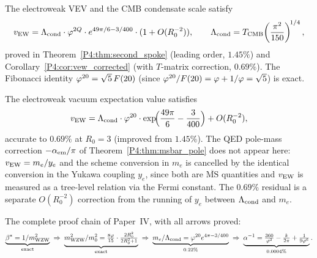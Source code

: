 \begin{result}
\label{P4:conj:spoke}
The electroweak VEV and the CMB condensate scale satisfy
\begin{equation}
  v_{\mathrm{EW}}
  = \Lambda_{\mathrm{cond}}\cdot\varphi^{2Q}\cdot e^{49\pi/6 - 3/400}\cdot(1+O(R_0^{-2})),
  \qquad
  \Lambda_{\mathrm{cond}} = T_{\mathrm{CMB}}\!\left(\frac{\pi^2}{150}\right)^{\!1/4},
  \label{P4:eq:spoke_formula}
\end{equation}
proved in Theorem~\ref{P4:thm:second_spoke} (leading order, $1.45\%$) and
Corollary~\ref{P4:cor:vew_corrected} (with $T$-matrix correction, $0.69\%$).
The Fibonacci identity $\varphi^{20} = \sqrt{5}\,F(20)$ (since
$\varphi^{20}/F(20) = \varphi + 1/\varphi = \sqrt{5}$) is exact.
\end{result}

\begin{corollary}
\label{P4:cor:vew_corrected}
The electroweak vacuum expectation value satisfies
\begin{equation}
  v_{\rm EW}
  = \Lambda_{\mathrm{cond}}\cdot\varphi^{20}\cdot\exp\!\Bigl(\frac{49\pi}{6} - \frac{3}{400}\Bigr)
  + O(R_0^{-2}),
  \label{P4:eq:vew_corrected}
\end{equation}
accurate to $0.69\%$ at $R_0=3$ (improved from $1.45\%$).
The QED pole-mass correction $-\alpha_{\mathrm{em}}/\pi$ of Theorem~\ref{P4:thm:msbar_pole}
does not appear here: $v_{\rm EW} = m_e/y_e$ and the scheme conversion
in $m_e$ is cancelled by the identical conversion in the Yukawa coupling
$y_e$, since both are $\overline{\mathrm{MS}}$ quantities and $v_{\rm EW}$
is measured as a tree-level relation via the Fermi constant.
The $0.69\%$ residual is a separate $O(R_0^{-2})$ correction from the
running of $y_e$ between $\Lambda_{\mathrm{cond}}$ and $m_e$.
\end{corollary}

The complete proof chain of Paper~IV, with all arrows proved:
\begin{equation}
  \underbrace{\beta^{*} = 1/m_{\mathrm{WZW}}^2}_{\rm exact}
  \;\Rightarrow\;
  \underbrace{m_{\mathrm{WZW}}^2/m_0^2 = \tfrac{8\varphi}{15}\cdot\tfrac{2R_0^2}{2R_0^2+1}}_{\rm exact}
  \;\Rightarrow\;
  \underbrace{m_e/\Lambda_{\mathrm{cond}} = \varphi^{20}e^{4\pi-3/400}}_{0.22\%}
  \;\Rightarrow\;
  \underbrace{\alpha^{-1} = \tfrac{360}{\varphi^2}-\tfrac{k}{2\pi}+\tfrac{1}{9\varphi^6}}_{0.0004\%}.
  \label{P4:eq:chain_final}
\end{equation}

